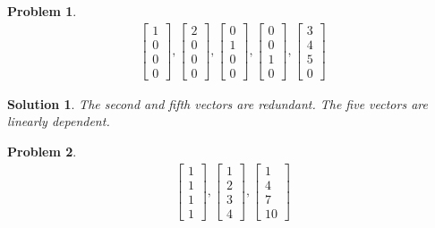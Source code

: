 \documentclass{article}
\newtheorem{problem}{Problem}
\newtheorem*{solution}{Solution}
\begin{document}
\begin{problem}
\begin{align*}
\begin{bmatrix} 1 \\ 0 \\ 0 \\ 0 \end{bmatrix}, 
\begin{bmatrix} 2 \\ 0 \\ 0 \\ 0 \end{bmatrix},
\begin{bmatrix} 0 \\ 1 \\ 0 \\ 0 \end{bmatrix},
\begin{bmatrix} 0 \\ 0 \\ 1 \\ 0 \end{bmatrix}, 
\begin{bmatrix} 3 \\ 4 \\ 5 \\ 0 \end{bmatrix}
\end{align*}
\end{problem}

\begin{solution}
The second and fifth vectors are redundant. The five vectors are linearly dependent.
\end{solution}

\begin{problem}
\begin{align*}
\begin{bmatrix} 1 \\ 1 \\ 1 \\ 1 \end{bmatrix}, 
\begin{bmatrix} 1 \\ 2 \\ 3 \\ 4 \end{bmatrix}, 
\begin{bmatrix} 1 \\ 4 \\ 7 \\ 10 \end{bmatrix}
\end{align*}
\end{problem}
\end{document}
